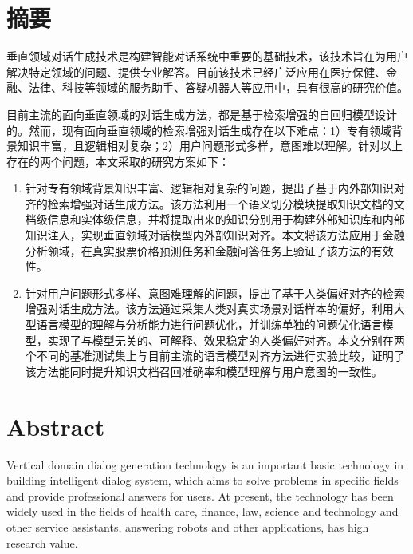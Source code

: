 \chapter{摘\texorpdfstring{\quad}{}要}

垂直领域对话生成技术是构建智能对话系统中重要的基础技术，该技术旨在为用户解决特定领域的问题、提供专业解答。目前该技术已经广泛应用在医疗保健、金融、法律、科技等领域的服务助手、答疑机器人等应用中，具有很高的研究价值。

目前主流的面向垂直领域的对话生成方法，都是基于检索增强的自回归模型设计的。然而，现有面向垂直领域的检索增强对话生成存在以下难点：1）专有领域背景知识丰富，且逻辑相对复杂；2）用户问题形式多样，意图难以理解。针对以上存在的两个问题，本文采取的研究方案如下：

\begin{enumerate}[topsep = 0 pt, itemsep= 0 pt, parsep=0pt, partopsep=0pt, leftmargin=0pt, itemindent=44pt, labelsep=6pt, listparindent=24pt, label=\arabic*)]
	\item 针对专有领域背景知识丰富、逻辑相对复杂的问题，提出了基于内外部知识对齐的检索增强对话生成方法。该方法利用一个语义切分模块提取知识文档的文档级信息和实体级信息，并将提取出来的知识分别用于构建外部知识库和内部知识注入，实现垂直领域对话模型内外部知识对齐。本文将该方法应用于金融分析领域，在真实股票价格预测任务和金融问答任务上验证了该方法的有效性。

	\item 针对用户问题形式多样、意图难理解的问题，提出了基于人类偏好对齐的检索增强对话生成方法。该方法通过采集人类对真实场景对话样本的偏好，利用大型语言模型的理解与分析能力进行问题优化，并训练单独的问题优化语言模型，实现了与模型无关的、可解释、效果稳定的人类偏好对齐。本文分别在两个不同的基准测试集上与目前主流的语言模型对齐方法进行实验比较，证明了该方法能同时提升知识文档召回准确率和模型理解与用户意图的一致性。
\end{enumerate}


\chapter{Abstract}

Vertical domain dialog generation technology is an important basic technology in building intelligent dialog system, which aims to solve problems in specific fields and provide professional answers for users. At present, the technology has been widely used in the fields of health care, finance, law, science and technology and other service assistants, answering robots and other applications, has high research value.

